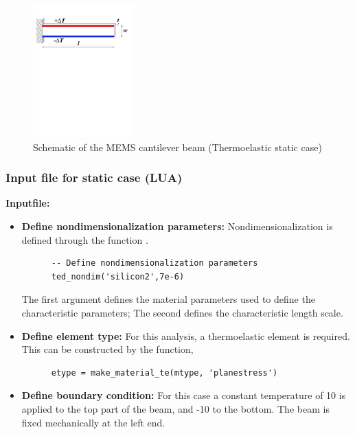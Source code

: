 \begin{figure}[htbp]
\centering
\includegraphics[trim = 0in 7in 0.5in 0in, clip, height = 2in]{fig/memscantileverbeam_te_sta.pdf}
\caption{Schematic of the MEMS cantilever beam (Thermoelastic static case)}
\label{fig:MEMSCantileverBeam_Te_Sta}
\end{figure}

\clearpage
\subsubsection*{Input file for static case (LUA)}
\begin{flushleft}
  \textbf{Inputfile:}
  \\
\end{flushleft}
\hspace{1in}
{\footnotesize
{}
}

\clearpage
\begin{itemize}

  \item{\textbf{Define nondimensionalization parameters:}}
  Nondimensionalization is defined through the function . 
  \begin{verbatim}
      -- Define nondimensionalization parameters
      ted_nondim('silicon2',7e-6)
  \end{verbatim}
  The first argument defines the material parameters used to define 
  the characteristic parameters; The second defines the characteristic 
  length scale.
  
  \item{\textbf{Define element type:}}
  For this analysis, a thermoelastic element is required. This can be 
  constructed by the function,
  \begin{verbatim}
      etype = make_material_te(mtype, 'planestress')
  \end{verbatim}

  \item{\textbf{Define boundary condition:}}
  For this case a constant temperature of 10 is applied to the top part 
  of the beam, and -10 to the bottom. The beam is fixed mechanically at 
  the left end.

\end{itemize}

